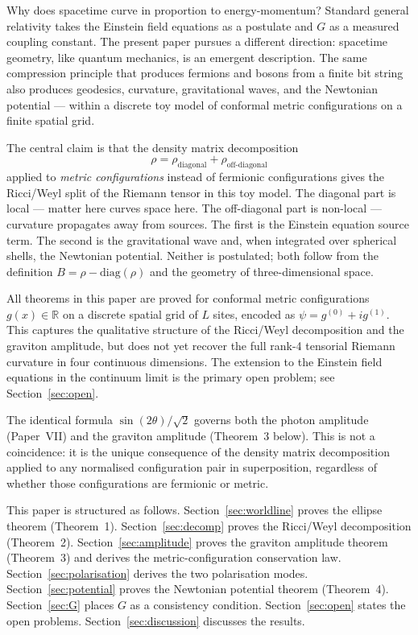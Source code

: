\documentclass[11pt]{article}
\begin{document}
Why does spacetime curve in proportion to energy-momentum?
Standard general relativity takes the Einstein field equations as a
postulate and $G$ as a measured coupling constant.
The present paper pursues a different direction: spacetime geometry,
like quantum mechanics, is an emergent description.
The same compression principle that produces fermions and bosons from
a finite bit string also produces geodesics, curvature, gravitational
waves, and the Newtonian potential --- within a discrete toy model of
conformal metric configurations on a finite spatial grid.

The central claim is that the density matrix decomposition
\[
  \rho = \rho_{\mathrm{diagonal}} + \rho_{\mathrm{off\text{-}diagonal}}
\]
applied to \emph{metric configurations} instead of fermionic
configurations gives the Ricci/Weyl split of the Riemann tensor in
this toy model.
The diagonal part is local --- matter here curves space here.
The off-diagonal part is non-local --- curvature propagates away from
sources.
The first is the Einstein equation source term.
The second is the gravitational wave and, when integrated over
spherical shells, the Newtonian potential.
Neither is postulated; both follow from the definition
$B = \rho - \mathrm{diag}(\rho)$ and the geometry of three-dimensional
space.

\begin{remark}
\label{rem:scope}
All theorems in this paper are proved for conformal metric
configurations $g(x) \in \mathbb{R}$ on a discrete spatial grid
of $L$ sites, encoded as $\psi = g^{(0)} + ig^{(1)}$.
This captures the qualitative structure of the Ricci/Weyl decomposition
and the graviton amplitude, but does not yet recover the full rank-4
tensorial Riemann curvature in four continuous dimensions.
The extension to the Einstein field equations in the continuum limit
is the primary open problem; see Section~\ref{sec:open}.
\end{remark}

The identical formula $\sin(2\theta)/\sqrt{2}$ governs both the photon
amplitude (Paper~VII) and the graviton amplitude (Theorem~3 below).
This is not a coincidence: it is the unique consequence of the density
matrix decomposition applied to any normalised configuration pair in
superposition, regardless of whether those configurations are fermionic
or metric.

This paper is structured as follows.
Section~\ref{sec:worldline} proves the ellipse theorem (Theorem~1).
Section~\ref{sec:decomp} proves the Ricci/Weyl decomposition
(Theorem~2).
Section~\ref{sec:amplitude} proves the graviton amplitude theorem
(Theorem~3) and derives the metric-configuration conservation law.
Section~\ref{sec:polarisation} derives the two polarisation modes.
Section~\ref{sec:potential} proves the Newtonian potential theorem
(Theorem~4).
Section~\ref{sec:G} places $G$ as a consistency condition.
Section~\ref{sec:open} states the open problems.
Section~\ref{sec:discussion} discusses the results.
\end{document}
